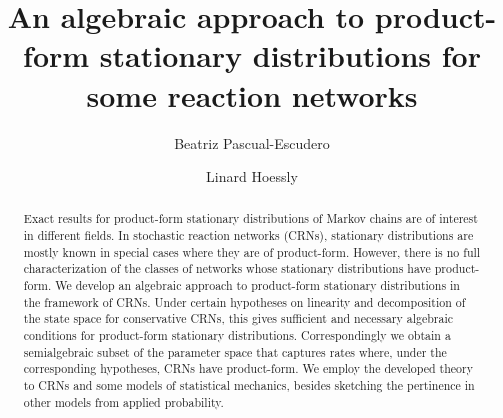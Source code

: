 \documentclass{amsart}
\theoremstyle{definition}
\theoremstyle{remark}
\theoremstyle{Conjecture/open problem}
\theoremstyle{assumption}
\theoremstyle{conjecture}
\numberwithin{equation}{section}
\begin{document}
\title[An algebraic approach to stochastic CRN]{An algebraic approach to product-form stationary distributions for some reaction networks}


\author[Beatriz Pascual-Escudero]{Beatriz Pascual-Escudero}
\address{Department of Mathematical Sciences, University of Copenhagen, Denmark}

\author[Linard Hoessly]{Linard Hoessly}
\address{Department of Mathematical Sciences, University of Copenhagen, Denmark}


\begin{abstract}
Exact results for product-form stationary distributions of Markov chains are of interest in different fields. In stochastic reaction networks (CRNs), stationary distributions are mostly known in special cases where they are of product-form. However, there is no full characterization of the classes of networks whose stationary distributions have product-form.
We develop an algebraic approach to product-form stationary distributions in the framework of CRNs. Under certain hypotheses on linearity and decomposition of the state space  for conservative CRNs, this gives sufficient and necessary algebraic conditions for product-form stationary distributions. Correspondingly we obtain a semialgebraic subset of the parameter space that captures rates where, under the corresponding hypotheses, CRNs have product-form. We employ the developed theory to CRNs and some models of statistical mechanics, besides sketching the pertinence in other models from applied probability.
\end{abstract}


\maketitle
\end{document}
